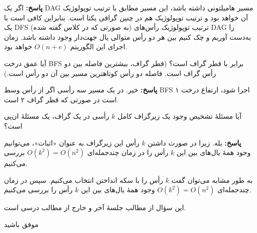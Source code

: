 \documentclass[12pt, a4paper]{article}
\newcommand{\vsp}{\vspace{34pt}}
\newcommand{\پاسخ}[2]{\color{answercolor}\textbf{پاسخ: }#2\color{black}\vspace{-0.3cm}}
\begin{document}
\پاسخ{\vsp\vsp}{
اگر یک DAG مسیر هامیلتونی داشته باشد، این مسیر مطابق با ترتیب توپولوژیک آن خواهد بود و ترتیب توپولوژیک هم در چنین گرافی یکتا است. بنابراین کافی است با یک DFS (به صورتی که در کلاس گفته شده) ترتیب توپولوژیک رأس‌های DAG را به‌دست آوریم و چک کنیم بین هر دو رأس متوالی یال جهت‌دار وجود داشته باشد. زمان اجرای این الگوریتم $O(n+e)$ خواهد بود.
	
}

آیا عمق درخت BFS برابر با قطر گراف است؟ (قطر گراف، بیشترین فاصله بین دو رأس گراف است. فاصله دو رأس کوتاهترین مسیر بین آن دو رأس است.)

\پاسخ{\vsp\vsp}{
خیر. در یک مسیر سه رأسی اگر از رأس وسط BFS اجرا شود، ارتفاع درخت ۱ است در صورتی که قطر گراف ۲ است.
	
}

آیا مسئلۀ تشخیص وجود یک زیرگراف کامل $k$ رأسی در یک گراف، یک مسئلۀ ان‌پی است؟

\پاسخ{\vsp\vsp}{
بله. زیرا در صورت داشتن $k$ رأس این زیرگراف به عنوان «اثبات»، می‌توانیم وجود همۀ یال‌های بین این $k$ رأس را در زمان چندجمله‌ای $O(k^2)=O(n^2)$ بررسی می‌کنیم.

به طور مشابه می‌توان گفت $k$ رأس را با سکه انداختن انتخاب می‌کنیم. سپس در زمان چندجمله‌ای 
	$O(k^2)=O(n^2)$ وجود همۀ یال‌های بین این $k$ رأس را بررسی می‌کنیم. 
	
این سؤال از مطالب جلسۀ آخر و خارج از مطالب درسی است.
	
}


\vspace{1pt}
\begin{flushleft}
موفق باشید
\end{flushleft}
\end{document}
